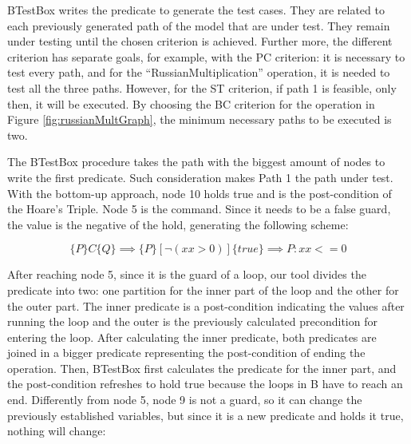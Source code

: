 \documentclass[runningheads]{llncs}
\begin{document}

 BTestBox writes the predicate to generate the test cases. They are related to each previously generated path of the model that are under test. They remain under testing until the chosen criterion is achieved. Further more, the different criterion has separate goals, for example, with the PC criterion: it is necessary to test every path, and for the ``RussianMultiplication'' operation, it is needed to test all the three paths. However, for the ST criterion, if path 1 is feasible, only then, it will be executed. By choosing the BC criterion for the operation in Figure \ref{fig:russianMultGraph}, the minimum necessary paths to be executed is two.

The BTestBox procedure takes the path with the biggest amount of nodes to write the first predicate. Such consideration makes Path 1 the path under test. With the bottom-up approach, node 10 holds true and is the post-condition of the Hoare's Triple. Node 5 is the command. Since it needs to be a false guard, the value is the negative of the hold, generating the following scheme:

$$\{P\} C \{Q\} \implies \{P\} [\neg(xx > 0)] \{true\} \implies P: xx <= 0$$

After reaching node 5, since it is the guard of a loop, our tool divides the predicate into two: one partition for the inner part of the loop and the other for the outer part. The inner predicate is a post-condition indicating the values after running the loop and the outer is the previously calculated precondition for entering the loop. After calculating the inner predicate, both predicates are joined in a bigger predicate representing the post-condition of ending the operation. Then, BTestBox first calculates the predicate for the inner part, and the post-condition refreshes to hold true because the loops in B have to reach an end. Differently from node 5, node 9 is not a guard, so it can change the previously established variables, but since it is a new predicate and holds it true, nothing will change:
\end{document}
